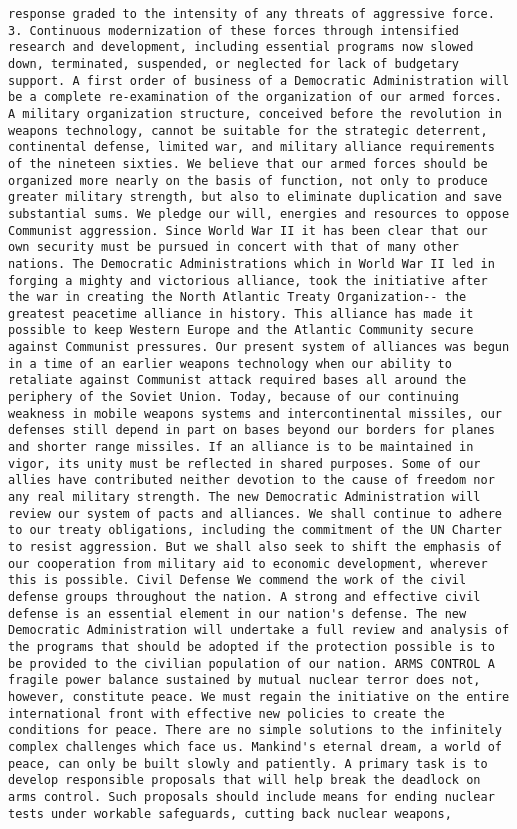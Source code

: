 \documentclass[
]{article}
\begin{document}
\begin{verbatim}
response graded to the intensity of any threats of aggressive force. 3. Continuous modernization of these forces through intensified research and development, including essential programs now slowed down, terminated, suspended, or neglected for lack of budgetary support. A first order of business of a Democratic Administration will be a complete re-examination of the organization of our armed forces. A military organization structure, conceived before the revolution in weapons technology, cannot be suitable for the strategic deterrent, continental defense, limited war, and military alliance requirements of the nineteen sixties. We believe that our armed forces should be organized more nearly on the basis of function, not only to produce greater military strength, but also to eliminate duplication and save substantial sums. We pledge our will, energies and resources to oppose Communist aggression. Since World War II it has been clear that our own security must be pursued in concert with that of many other nations. The Democratic Administrations which in World War II led in forging a mighty and victorious alliance, took the initiative after the war in creating the North Atlantic Treaty Organization-- the greatest peacetime alliance in history. This alliance has made it possible to keep Western Europe and the Atlantic Community secure against Communist pressures. Our present system of alliances was begun in a time of an earlier weapons technology when our ability to retaliate against Communist attack required bases all around the periphery of the Soviet Union. Today, because of our continuing weakness in mobile weapons systems and intercontinental missiles, our defenses still depend in part on bases beyond our borders for planes and shorter range missiles. If an alliance is to be maintained in vigor, its unity must be reflected in shared purposes. Some of our allies have contributed neither devotion to the cause of freedom nor any real military strength. The new Democratic Administration will review our system of pacts and alliances. We shall continue to adhere to our treaty obligations, including the commitment of the UN Charter to resist aggression. But we shall also seek to shift the emphasis of our cooperation from military aid to economic development, wherever this is possible. Civil Defense We commend the work of the civil defense groups throughout the nation. A strong and effective civil defense is an essential element in our nation's defense. The new Democratic Administration will undertake a full review and analysis of the programs that should be adopted if the protection possible is to be provided to the civilian population of our nation. ARMS CONTROL A fragile power balance sustained by mutual nuclear terror does not, however, constitute peace. We must regain the initiative on the entire international front with effective new policies to create the conditions for peace. There are no simple solutions to the infinitely complex challenges which face us. Mankind's eternal dream, a world of peace, can only be built slowly and patiently. A primary task is to develop responsible proposals that will help break the deadlock on arms control. Such proposals should include means for ending nuclear tests under workable safeguards, cutting back nuclear weapons, 
\end{verbatim}
\end{document}
